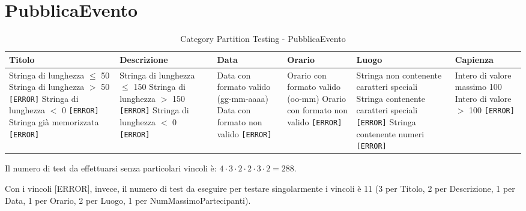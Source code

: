 \section{PubblicaEvento}
\begin{table}[H]
	\centering
	\footnotesize
	\renewcommand{\arraystretch}{1.3}
	\begin{tabular}{|p{2.5cm}|p{2.5cm}|p{2.5cm}|p{2.5cm}|p{2.5cm}|p{2.5cm}|}
		\hline
		\textbf{Titolo} & \textbf{Descrizione} & \textbf{Data} & \textbf{Orario} & \textbf{Luogo} & \textbf{Capienza} \\
		\hline
		Stringa di lunghezza $\leq$ 50 \newline
		Stringa di lunghezza $>$ 50 \texttt{[ERROR]} \newline
		Stringa di lunghezza $<$ 0 \texttt{[ERROR]} \newline
		Stringa già memorizzata \texttt{[ERROR]} &

		Stringa di lunghezza $\leq$ 150 \newline
		Stringa di lunghezza $>$ 150 \texttt{[ERROR]} \newline
		Stringa di lunghezza $<$ 0 \texttt{[ERROR]} &

		Data con formato valido (gg-mm-aaaa) \newline
		Data con formato non valido \texttt{[ERROR]} &

		Orario con formato valido (oo-mm) \newline
		Orario con formato non valido \texttt{[ERROR]} &

		Stringa non contenente caratteri speciali \newline
		Stringa contenente caratteri speciali \texttt{[ERROR]} \newline
		Stringa contenente numeri \texttt{[ERROR]} &

		Intero di valore massimo 100 \newline
		Intero di valore $>$ 100 \texttt{[ERROR]} \\
		\hline
	\end{tabular}
	\caption{Category Partition Testing - PubblicaEvento}
\end{table}

\noindent Il numero di test da effettuarsi senza particolari vincoli è: $4 \cdot 3 \cdot 2 \cdot 2 \cdot 3 \cdot 2 = 288$.

\noindent Con i vincoli [ERROR], invece, il numero di test da eseguire per testare singolarmente i vincoli è 11 (3 per Titolo, 2 per Descrizione, 1 per Data, 1 per Orario, 2 per Luogo, 1 per NumMassimoPartecipanti).

